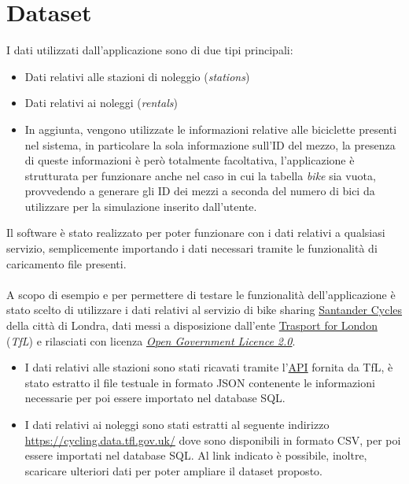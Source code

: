 \documentclass[a4paper, 12pt]{article}
\begin{document}
\section{Dataset}
I dati utilizzati dall'applicazione sono di due tipi principali:
\begin{itemize}
	\item Dati relativi alle stazioni di noleggio (\textit{stations})
	\item Dati relativi ai noleggi (\textit{rentals})
	\item In aggiunta, vengono utilizzate le informazioni relative alle biciclette presenti nel sistema, in particolare la sola informazione sull'ID del mezzo, la presenza di queste informazioni è però totalmente facoltativa, l'applicazione è strutturata per funzionare anche nel caso in cui la tabella \textit{bike} sia vuota, provvedendo a generare gli ID dei mezzi a seconda del numero di bici da utilizzare per la simulazione inserito dall'utente.
\end{itemize}
Il software è stato realizzato per poter funzionare con i dati relativi a qualsiasi servizio, semplicemente importando i dati necessari tramite le funzionalità di caricamento file presenti.\\\\
A scopo di esempio e per permettere di testare le funzionalità dell'applicazione è stato scelto di utilizzare i dati relativi al servizio di bike sharing \href{https://www.santandercycles.co.uk/london}{Santander Cycles} della città di Londra, dati messi a disposizione dall'ente \href{https://tfl.gov.uk/}{Trasport for London} (\textit{TfL}) e rilasciati con licenza \textit{\href{https://tfl.gov.uk/corporate/terms-and-conditions/transport-data-service}{Open Government Licence 2.0}}.
\begin{itemize}
	\item I dati relativi alle stazioni sono stati ricavati tramite l'\href{https://api.tfl.gov.uk/}{API} fornita da TfL, è stato estratto il file testuale in formato JSON contenente le informazioni necessarie per poi essere importato nel database SQL.
	\item I dati relativi ai noleggi sono stati estratti al seguente indirizzo  \url{https://cycling.data.tfl.gov.uk/} dove sono disponibili in formato CSV, per poi essere importati nel database SQL. Al link indicato è possibile, inoltre, scaricare ulteriori dati per poter ampliare il dataset proposto.
\end{itemize}

\newpage
\end{document}
